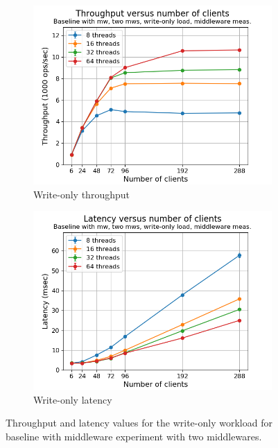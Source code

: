 \documentclass[11pt,a4paper]{article}
\begin{document}
\begin{figure}[h]
\centering
\begin{subfigure}{.5\textwidth}
  \centering
  \includegraphics[width=1.0\linewidth,trim={5px 0px 20px 0px},clip]{img/plot/mwb2-wo-tp_mw.png}
  \caption{Write-only throughput}
  \label{fig:mwb2-wo-tp_mw}
\end{subfigure}%
\begin{subfigure}{.5\textwidth}
  \centering
  \includegraphics[width=1.0\linewidth,trim={5px 0px 20px 0px},clip]{img/plot/mwb2-wo-lat_mw}
  \caption{Write-only latency}
  \label{fig:mwb2-wo-lat_mw}
\end{subfigure}
\caption{Throughput and latency values for the write-only workload for baseline with middleware experiment with two middlewares.}
\label{fig:mwb2-wo_mw}
\end{figure}
\end{document}
